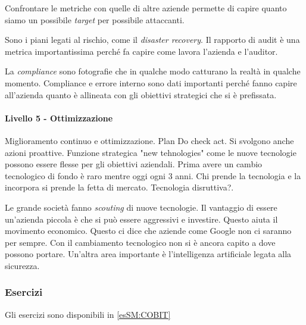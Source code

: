 Confrontare le metriche con quelle di altre aziende permette di capire quanto 
siamo un possibile \textit{target} per possibile attaccanti.


Sono i piani legati al rischio, come il \textit{disaster recovery}.
Il rapporto di audit è una metrica importantissima perché fa capire come lavora 
l'azienda e l'auditor.



La \textit{compliance} sono fotografie che in qualche modo catturano la realtà 
in qualche momento. Compliance e errore interno sono dati importanti perché 
fanno capire all'azienda quanto è allineata con gli obiettivi strategici che si 
è prefissata.


\paragraph{Livello 5 - Ottimizzazione}

Miglioramento continuo e ottimizzazione. Plan Do check act.
Si svolgono anche azioni proattive. Funzione strategica "new tehnologies" come 
le nuove tecnologie possono essere flesse per gli obiettivi aziendali. 
Prima avere un cambio tecnologico di fondo è raro mentre oggi ogni 3 anni. Chi 
prende la tecnologia e la incorpora si prende la fetta di mercato. Tecnologia 
disruttiva?.




Le grande società fanno \textit{scouting} di nuove tecnologie. Il vantaggio di 
essere un'azienda piccola è che si può essere aggressivi e investire. Questo 
aiuta il movimento economico. Questo ci dice che aziende come Google non ci 
saranno per sempre. Con il cambiamento tecnologico non si è ancora capito a dove 
possono portare. Un'altra area importante è l'intelligenza artificiale legata 
alla sicurezza.


\subsubsection{Esercizi}

Gli esercizi sono disponibili in \ref{esSM:COBIT}

